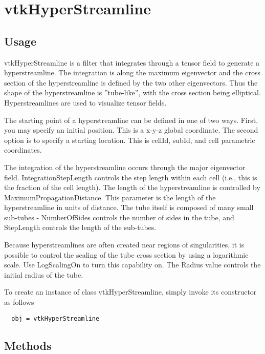\section{vtkHyperStreamline}

\subsection{Usage}

 vtkHyperStreamline is a filter that integrates through a tensor field to 
 generate a hyperstreamline. The integration is along the maximum eigenvector
 and the cross section of the hyperstreamline is defined by the two other
 eigenvectors. Thus the shape of the hyperstreamline is ''tube-like'', with 
 the cross section being elliptical. Hyperstreamlines are used to visualize
 tensor fields.

 The starting point of a hyperstreamline can be defined in one of two ways. 
 First, you may specify an initial position. This is a x-y-z global 
 coordinate. The second option is to specify a starting location. This is 
 cellId, subId, and  cell parametric coordinates.

 The integration of the hyperstreamline occurs through the major eigenvector 
 field. IntegrationStepLength controls the step length within each cell 
 (i.e., this is the fraction of the cell length). The length of the 
 hyperstreamline is controlled by MaximumPropagationDistance. This parameter
 is the length of the hyperstreamline in units of distance. The tube itself 
 is composed of many small sub-tubes - NumberOfSides controls the number of 
 sides in the tube, and StepLength controls the length of the sub-tubes.

 Because hyperstreamlines are often created near regions of singularities, it
 is possible to control the scaling of the tube cross section by using a 
 logarithmic scale. Use LogScalingOn to turn this capability on. The Radius 
 value controls the initial radius of the tube.

To create an instance of class vtkHyperStreamline, simply
invoke its constructor as follows
\begin{verbatim}
  obj = vtkHyperStreamline
\end{verbatim}
\subsection{Methods}

